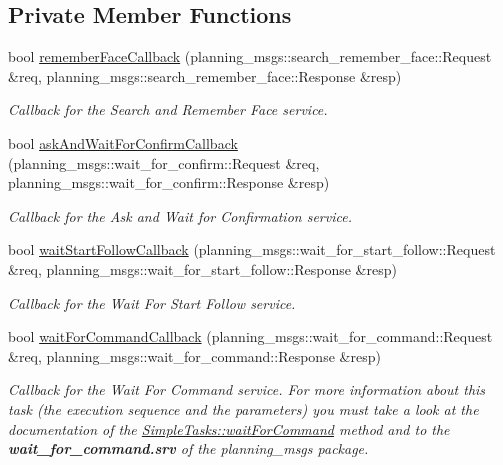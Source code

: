 \subsection*{Private Member Functions}
\begin{DoxyCompactItemize}
\item 
bool \hyperlink{class_task_advertiser_af9a75fa9dc0093208d0a540be856a732}{remember\+Face\+Callback} (planning\+\_\+msgs\+::search\+\_\+remember\+\_\+face\+::\+Request \&req, planning\+\_\+msgs\+::search\+\_\+remember\+\_\+face\+::\+Response \&resp)
\begin{DoxyCompactList}\small\item\em Callback for the Search and Remember Face service. \end{DoxyCompactList}\item 
bool \hyperlink{class_task_advertiser_a12d4edf2bc4c98b845b59c13a48b1cff}{ask\+And\+Wait\+For\+Confirm\+Callback} (planning\+\_\+msgs\+::wait\+\_\+for\+\_\+confirm\+::\+Request \&req, planning\+\_\+msgs\+::wait\+\_\+for\+\_\+confirm\+::\+Response \&resp)
\begin{DoxyCompactList}\small\item\em Callback for the Ask and Wait for Confirmation service. \end{DoxyCompactList}\item 
bool \hyperlink{class_task_advertiser_a8f177e18e3131f0200730ae334c542f1}{wait\+Start\+Follow\+Callback} (planning\+\_\+msgs\+::wait\+\_\+for\+\_\+start\+\_\+follow\+::\+Request \&req, planning\+\_\+msgs\+::wait\+\_\+for\+\_\+start\+\_\+follow\+::\+Response \&resp)
\begin{DoxyCompactList}\small\item\em Callback for the Wait For Start Follow service. \end{DoxyCompactList}\item 
bool \hyperlink{class_task_advertiser_a1a150781421013d9c08d58e8700f9c88}{wait\+For\+Command\+Callback} (planning\+\_\+msgs\+::wait\+\_\+for\+\_\+command\+::\+Request \&req, planning\+\_\+msgs\+::wait\+\_\+for\+\_\+command\+::\+Response \&resp)
\begin{DoxyCompactList}\small\item\em Callback for the Wait For Command service. For more information about this task (the execution sequence and the parameters) you must take a look at the documentation of the \hyperlink{class_simple_tasks_ae9e4541c3e71d536b21e24c81f216235}{Simple\+Tasks\+::wait\+For\+Command} method and to the {\bfseries wait\+\_\+for\+\_\+command.\+srv} of the planning\+\_\+msgs package. \end{DoxyCompactList}\end{DoxyCompactItemize}
